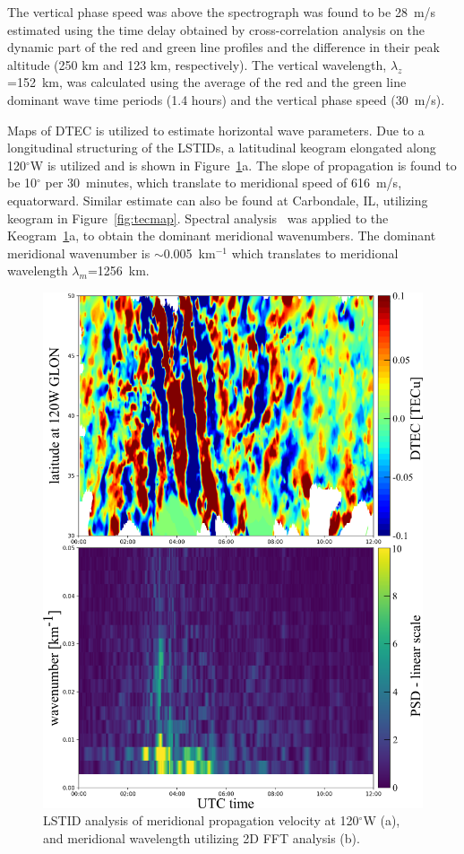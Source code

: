 \documentclass[crop=false,class=mitthesis,oneside,font=12pt]{standalone}
\begin{document}
The vertical phase speed was  above the spectrograph was found to be 28~m/s estimated using the time delay obtained by cross-correlation analysis on the dynamic part of the red and green line profiles and the difference in their peak altitude (250 km and 123 km, respectively). The vertical wavelength, $\lambda_z$ =152~km, was calculated using the average of the red and the green line dominant wave time periods (1.4 hours) and the vertical phase speed (30~m/s).  

Maps of DTEC is utilized to estimate horizontal wave parameters. Due to a longitudinal structuring of the LSTIDs,  a latitudinal keogram elongated along 120$^\circ$W is utilized and is shown in Figure~\ref{fig:tec_wave}a. The slope of propagation is found to be 10$^\circ$ per 30~minutes, which translate to meridional speed of 616~m/s, equatorward. Similar estimate can also be found at Carbondale, IL, utilizing keogram in Figure~\ref{fig:tecmap}. Spectral analysis~\citep{Mrak2018gw} was applied to the Keogram~\ref{fig:tec_wave}a, to obtain the dominant meridional wavenumbers. The dominant meridional wavenumber is $\sim$0.005~km$^{-1}$ which translates to meridional wavelength $\lambda_m$=1256~km.

\begin{figure}[H]
\centering\includegraphics[width=35pc]{wl.png}
\caption{LSTID analysis of meridional propagation velocity at 120$^\circ$W (a), and meridional wavelength utilizing 2D FFT analysis (b).}
\label{fig:tec_wave}
\end{figure} 
\end{document}
